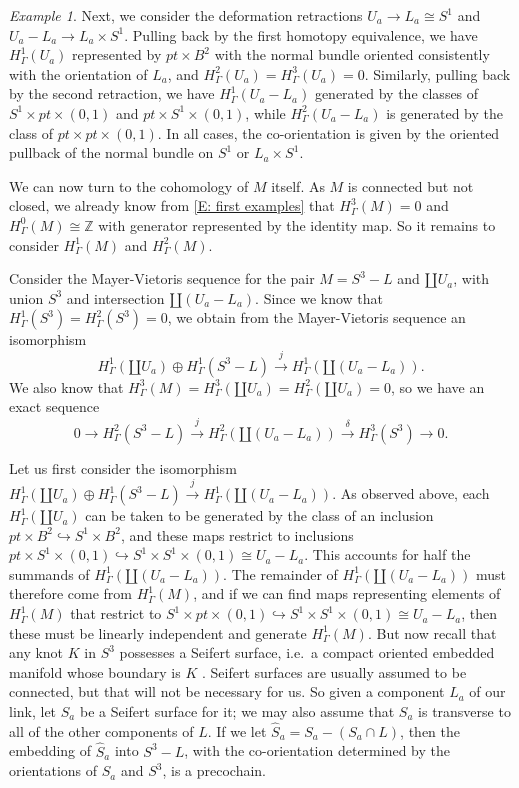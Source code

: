 \documentclass[12pt]{article}
\theoremstyle{plain}
\theoremstyle{definition}
\theoremstyle{remark}
\newtheorem{example}[theorem]{Example}
\newcommand{\xr}{\xrightarrow}
\newcommand{\into}{\hookrightarrow}
\newcommand{\Z}{\mathbb{Z}}
\begin{document}
\begin{example}
Next, we consider the deformation retractions $U_a \to L_a \cong S^1$ and $U_a - L_a \to L_a \times S^1$.
Pulling back by the first homotopy equivalence, we have $H^1_\Gamma(U_a)$ represented by $pt \times B^2$ with the normal bundle oriented consistently with the orientation of $L_a$, and  $H^2_\Gamma(U_a) = H^3_\Gamma(U_a) = 0$. Similarly, pulling back by the second retraction, we have $H^1_\Gamma(U_a - L_a)$ generated by the classes of $S^1 \times pt \times (0,1)$ and $pt \times S^1 \times (0,1)$, while $H^2_\Gamma(U_a - L_a)$ is generated by the class of $pt \times pt \times (0,1)$.
In all cases, the co-orientation is given by the oriented pullback of the normal bundle on $S^1$ or $L_a \times S^1$.

We can now turn to the cohomology of $M$ itself.
As $M$ is connected but not closed, we already know from \cref{E: first examples} that $H^3_\Gamma(M) = 0$ and $H^0_\Gamma(M) \cong \Z$ with generator represented by the identity map.
So it remains to consider $H^1_\Gamma(M)$ and $H^2_\Gamma(M)$.

Consider the Mayer-Vietoris sequence for the pair $M = S^3 - L$ and $\amalg U_a$, with union $S^3$ and intersection $\amalg (U_a - L_a)$.
Since we know that $H^1_\Gamma(S^3) = H^2_\Gamma(S^3)=0$, we obtain from the Mayer-Vietoris sequence an isomorphism
$$H^1_\Gamma(\amalg U_a) \oplus H^1_\Gamma(S^3 - L) \xr{j} H^1_\Gamma( \amalg(U_a - L_a)).$$
We also know that $H^3_\Gamma(M) = H^3_\Gamma(\amalg U_a) = H^2_\Gamma(\amalg U_a) = 0$, so we have an exact sequence
$$0 \to H^2_\Gamma(S^3 - L) \xr{j} H^2_\Gamma( \amalg(U_a - L_a)) \xr{\delta} H^3_\Gamma(S^3) \to 0.$$

Let us first consider the isomorphism $H^1_\Gamma(\amalg U_a) \oplus H^1_\Gamma(S^3 - L) \xr{j} H^1_\Gamma( \amalg(U_a - L_a)).$
As observed above, each $H^1_\Gamma(\amalg U_a)$ can be taken to be generated by the class of an inclusion
$pt \times B^2 \into S^1 \times B^2$, and these maps restrict to inclusions $pt \times S^1 \times (0,1)  \into S^1 \times S^1 \times (0,1) \cong U_a - L_a$.
This accounts for half the summands of $H^1_\Gamma( \amalg(U_a - L_a))$.
The remainder of $H^1_\Gamma( \amalg(U_a - L_a))$ must therefore come from $H^1_\Gamma(M)$, and if we can find maps representing elements of $H^1_\Gamma(M)$ that restrict to $S^1 \times pt \times (0,1)  \into S^1 \times S^1 \times (0,1) \cong U_a - L_a$, then these must be linearly independent and generate $H^1_\Gamma(M)$.
But now recall that any knot $K$ in $S^3$ possesses a Seifert surface, i.e.\ a compact oriented embedded manifold whose boundary is $K$ \cite{REF FOR SMOOTH}.
Seifert surfaces are usually assumed to be connected, but that will not be necessary for us.
So given a component $L_a$ of our link, let $S_a$ be a Seifert surface for it; we may also assume that $S_a$ is transverse to all of the other components of $L$.
If we let $\hat S_a = S_a - (S_a \cap L)$, then the embedding of $\hat S_a$ into $S^3 - L$, with the co-orientation determined by the orientations of $S_a$ and $S^3$, is a precochain.


\end{example}
\end{document}
